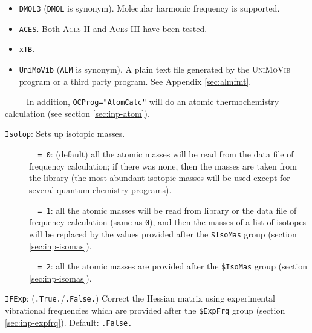 \documentclass[12pt,english]{extarticle}
\begin{document}
\begin{itemize}
\item \verb|DMOL3| (\verb|DMOL| is synonym). Molecular harmonic frequency is supported.
\item \verb|ACES|. Both \textsc{Aces-II} and \textsc{Aces-III} have been tested.
\item \verb|xTB|.
\item \verb|UniMoVib| (\verb|ALM| is synonym). A plain text file generated by the \textsc{UniMoVib} program or a third party program. See Appendix \ref{sec:almfmt}.
\end{itemize}
\verb|     |In addition, \verb|QCProg="AtomCalc"| will do an atomic thermochemistry calculation (see section \ref{sec:inp-atom}).

\bigskip{}\bigskip{}
\verb|Isotop|: Sets up isotopic masses.
\begin{description}
\item[ ]\verb|  = 0|: (default) all the atomic masses will be read from the data file of frequency calculation;
if there was none, then the masses are taken from the library (the most abundant isotopic masses will be used except for several quantum chemistry programs).
\item[ ]\verb|  = 1|: all the atomic masses will be read from library or the data file of
frequency calculation (same as \verb|0|), and then the masses of a list of isotopes will be
replaced by the values provided after the \verb|$IsoMas| group (section \ref{sec:inp-isomas}).
\item[ ]\verb|  = 2|: all the atomic masses are provided after the \verb|$IsoMas| group (section \ref{sec:inp-isomas}).
\end{description}

\bigskip{}\bigskip{}
\verb|IFExp|: (\verb|.True.|/\verb|.False.|) Correct the Hessian matrix using
experimental vibrational frequencies which are provided after the \verb|$ExpFrq| group (section \ref{sec:inp-expfrq}).
Default: \verb|.False.|
\end{document}
